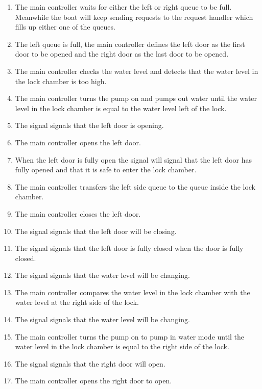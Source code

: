 \documentclass{article}
\begin{document}
        \begin{enumerate}
            \item The main controller waits for either the left or right queue to be full. Meanwhile the boat will keep sending requests to the request handler which fills up either one of the queues.
            \item The left queue is full, the main controller defines the left door as the first door to be opened and the right door as the last door to be opened.
            \item The main controller checks the water level and detects that the water level in the lock chamber is too high.
            \item The main controller turns the pump on and pumps out water until the water level in the lock chamber is equal to the water level left of the lock.
            \item The signal signals that the left door is opening.
            \item The main controller opens the left door. 
            \item When the left door is fully open the signal will signal that the left door has fully opened and that it is safe to enter the lock chamber.
            \item The main controller transfers the left side queue to the queue inside the lock chamber.
            \item The main controller closes the left door.
            \item The signal signals that the left door will be closing.
            \item The signal signals that the left door is fully closed when the door is fully closed.
            \item The signal signals that the water level will be changing.
            \item The main controller compares the water level in the lock chamber with the water level at the right side of the lock.
            \item The signal signals that the water level will be changing.
            \item The main controller turns the pump on to pump in water mode until the water level in the lock chamber is equal to the right side of the lock.
            \item The signal signals that the right door will open.
            \item The main controller opens the right door to open.

\end{enumerate}
\end{document}
